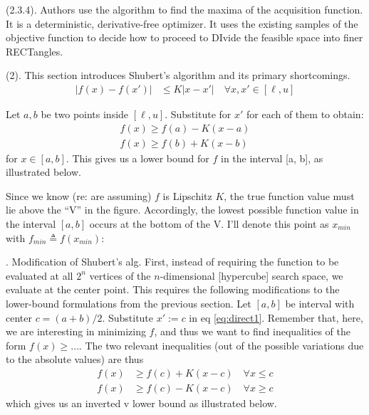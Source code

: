 \documentclass[11pt]{article}
\begin{document}
 (2.3.4). Authors use the  algorithm to find the maxima of the acquisition function. It is a deterministic, derivative-free optimizer. It uses the existing samples of the objective function to decide how to proceed to DIvide the feasible space into finer RECTangles.

\myspace
{}

 (2). This section introduces Shubert's algorithm and its primary shortcomings.
\begin{align}
	|f(x) - f(x')| 
		&\leq K |x - x'| \quad \forall x, x' \in [\ell, u]  \label{eq:direct1}
\end{align}

Let $a, b$ be two points inside $[\ell, u]$. Substitute for $x'$ for each of them to obtain:
\begin{align}
	f(x) \geq f(a) - K(x -a) \\
	f(x) \geq f(b) + K(x - b) 
\end{align}
for $x \in [a, b]$. This gives us a lower bound for $f$ in the interval [a, b], as illustrated below. 

Since we know (re: are assuming) $f$ is Lipschitz $K$, the true function value must lie above the ``V'' in the figure. Accordingly, the lowest possible function value in the interval $[a, b]$ occurs at the bottom of the V. I'll denote this point as $x_{min}$ with $f_{min} \triangleq f(x_{min})$:

. Modification of Shubert's alg. First, instead of requiring the function to be evaluated at all $2^n$ vertices of the $n$-dimensional [hypercube] search space, we evaluate at the center point. This requires the following modifications to the lower-bound formulations from the previous section. Let $[a, b]$ be interval with center $c = (a + b)/2$. Substitute $x' := c$ in eq \ref{eq:direct1}. Remember that, here, we are interesting in minimizing $f$, and thus we want to find inequalities of the form $f(x) \geq \ldots$. The two relevant inequalities (out of the possible variations due to the absolute values) are thus
\begin{align}
	f(x) 
		&\geq f(c) + K(x - c) \quad \forall x \leq c \\
	f(x)
		&\geq f(c) - K(x -c) \quad \forall x \geq c
\end{align}
which gives us an inverted v lower bound as illustrated below. 
\end{document}
